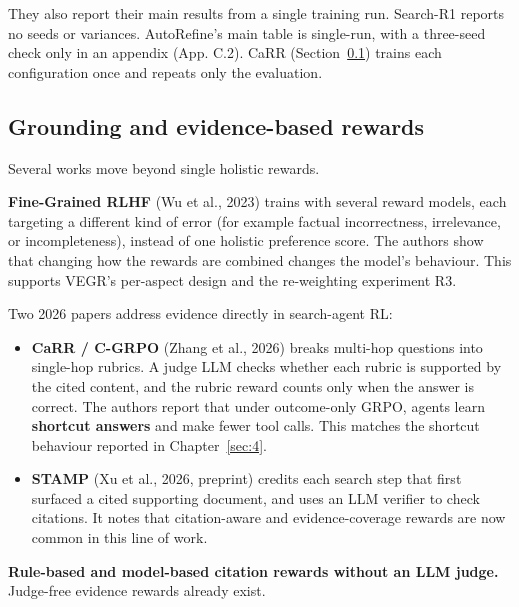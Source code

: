 They also report their main results from a single training run.
Search-R1 reports no seeds or variances. AutoRefine's main table is
single-run, with a three-seed check only in an appendix (App. C.2). CaRR
(Section~\ref{sec:2.7}) trains each configuration once and repeats only
the evaluation.

\subsection{Grounding and evidence-based rewards}\label{sec:2.7}

Several works move beyond single holistic rewards.

\textbf{Fine-Grained RLHF} (Wu et al., 2023) trains with several reward
models, each targeting a different kind of error (for example factual
incorrectness, irrelevance, or incompleteness), instead of one holistic
preference score. The authors show that changing how the rewards are
combined changes the model's behaviour. This supports VEGR's per-aspect
design and the re-weighting experiment R3.

Two 2026 papers address evidence directly in search-agent RL:

\begin{itemize}
\tightlist
\item
  \textbf{CaRR / C-GRPO} (Zhang et al., 2026) breaks multi-hop questions
  into single-hop rubrics. A judge LLM checks whether each rubric is
  supported by the cited content, and the rubric reward counts only when
  the answer is correct. The authors report that under outcome-only
  GRPO, agents learn \textbf{shortcut answers} and make fewer tool
  calls. This matches the shortcut behaviour reported in
  Chapter~\ref{sec:4}.
\item
  \textbf{STAMP} (Xu et al., 2026, preprint) credits each search step
  that first surfaced a cited supporting document, and uses an LLM
  verifier to check citations. It notes that citation-aware and
  evidence-coverage rewards are now common in this line of work.
\end{itemize}

\textbf{Rule-based and model-based citation rewards without an LLM
judge.} Judge-free evidence rewards already exist.

